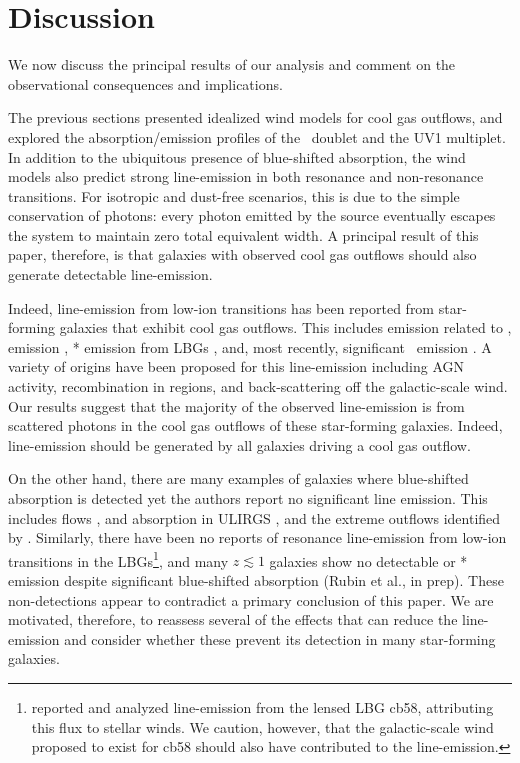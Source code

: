 \documentclass[12pt,preprint]{aastex}
\begin{document}
\section{Discussion}
\label{sec:discuss}

We now discuss the principal results of our analysis and comment on
the observational consequences and implications. 

The previous sections presented idealized wind models for
cool gas outflows, and explored the absorption/emission profiles of
the \mgiid\ doublet and the  UV1 multiplet.  In addition to
the ubiquitous presence of blue-shifted absorption, the wind models
also predict strong line-emission in both resonance
and non-resonance transitions.  For isotropic and dust-free scenarios,
this is 
due to the 
simple conservation of photons: every photon emitted by
the source eventually escapes the system to maintain
zero total equivalent width. A principal result of this paper,
therefore, is that galaxies with observed cool gas outflows should
also generate detectable line-emission.
 
Indeed, line-emission from low-ion transitions has been reported from 
star-forming galaxies that exhibit cool gas outflows.  
This includes emission related to  \citep{phillips93,cth+10},
 emission \citep{wcp+09,rwk+10}, 
* emission from LBGs \citep{shapley03},
and, most recently, significant \feiis\ emission \citep{rubin+10c}. 
A variety of origins have been proposed for this
line-emission including AGN activity, recombination in 
regions, and back-scattering off the galactic-scale wind.
Our results suggest that the majority of the observed line-emission is 
from scattered photons in the cool gas outflows of these star-forming
galaxies.  Indeed, line-emission should be generated by all 
galaxies driving a cool gas outflow.

On the other hand,
there are many examples of galaxies where blue-shifted absorption is
detected yet the authors report no significant line emission.  This
includes  flows \citep{rvs05a,martin05,smn+09}, 
 and  absorption in
ULIRGS \citep{mb09}, and the extreme  outflows identified
by \cite{tmd07}.  Similarly, there have been no reports of
resonance line-emission from low-ion transitions in the
LBGs\footnote{\citet{psa+00}
  reported and analyzed  line-emission from the lensed LBG
  cb58, attributing this flux to stellar winds.  We caution, however,
  that the galactic-scale wind proposed to exist for cb58 should also
  have contributed to the  line-emission.}, and many
$z \lesssim 1$ galaxies show no detectable  or *
emission despite significant blue-shifted absorption (Rubin et al., in prep). 
These non-detections appear to contradict a primary conclusion of 
this paper.   We are motivated, therefore, to
reassess several of the effects that can reduce the line-emission
and consider whether these prevent its detection in many
star-forming galaxies.  
\end{document}
